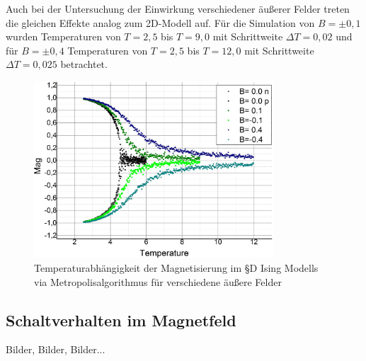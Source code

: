 Auch bei der Untersuchung der Einwirkung verschiedener äußerer Felder treten die gleichen Effekte analog zum 2D-Modell auf. Für die Simulation von $B=\pm 0,1$ wurden Temperaturen von $T=2,5$ bis $T=9,0$ mit Schrittweite $\Delta T= 0,02$ und für $B=\pm 0,4$ Temperaturen von $T=2,5$ bis $T=12,0$ mit Schrittweite $\Delta T= 0,025$ betrachtet.
 \begin{figure}[H]
	\centering
	\includegraphics[width=0.8\textwidth]{../Graph_Export/MP3D/m(T)_MP3D_Plot.jpg}	
	\caption{Temperaturabhängigkeit der Magnetisierung im §D Ising Modells via Metropolisalgorithmus für verschiedene äußere Felder}
	\label{mp3db}
\end{figure}


\subsection{Schaltverhalten im Magnetfeld}

Bilder, Bilder, Bilder...
